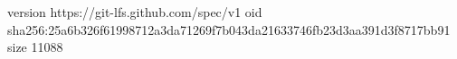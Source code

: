 version https://git-lfs.github.com/spec/v1
oid sha256:25a6b326f61998712a3da71269f7b043da21633746fb23d3aa391d3f8717bb91
size 11088
